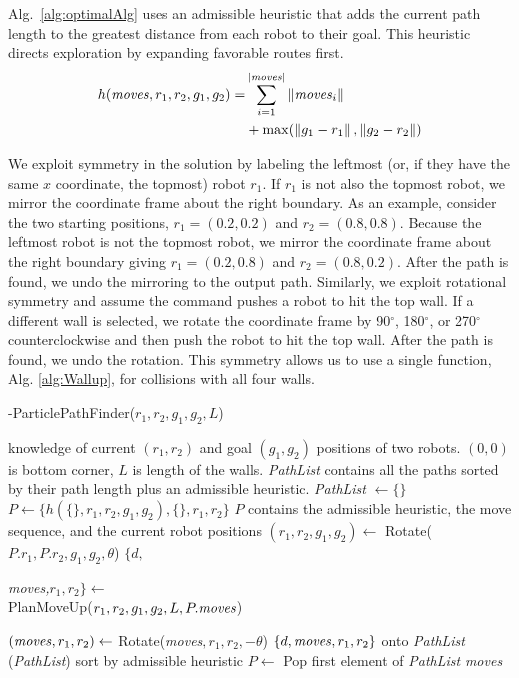 Alg.~\ref{alg:optimalAlg} uses an admissible heuristic that adds the current path length to the greatest distance from each robot to their goal. This heuristic directs exploration by expanding favorable routes first.
\begin{align}\label{eq:admissibleHeuristic}
h(\text{\emph{moves}}, r_1,r_2,g_1,g_2) =& \sum_{i=1}^{|\text{\emph{moves}}|} \left\lVert\text{\emph{moves}}_i\right\rVert  \\
&+  \max( \left\lVert g_1-r_1\right\rVert, \left\lVert g_2-r_2\right\rVert ) \nonumber
\end{align}


We  exploit symmetry in the solution by labeling the leftmost (or, if they have the same $x$ coordinate, the topmost) robot $r_1$. 
 If $r_1$ is not also the topmost robot, we mirror the coordinate frame about the right boundary. 
 As an example, consider the two starting positions, $r_1 =  (0.2, 0.2) $ and $r_2 = (0.8, 0.8)$. 
  Because the leftmost robot is not the topmost robot, we mirror the coordinate frame about the right boundary giving $r_1 = (0.2, 0.8)$ and $r_2 = (0.8,0.2)$. 
 After the path is found, we undo the mirroring to the output path. 
  Similarly, we exploit rotational symmetry and assume the command pushes a robot to hit the top wall.
   If a different wall is selected, we rotate the coordinate frame by 90$^{\circ}$, 180$^{\circ}$, or 270$^{\circ}$ counterclockwise and then push the robot to hit the top wall.  After the path is found, we undo the rotation. 
   This symmetry allows us to use a single function, Alg. \ref{alg:Wallup},  for collisions with all four walls. 

\begin{algorithm}[htb]
\caption{ { -ParticlePathFinder}($r_1,r_2,g_1,g_2,L$)}\label{alg:optimalAlg}
\begin{algorithmic}[1]
\Require knowledge of current $(r_1,r_2)$ and goal $(g_1,g_2)$ positions of  two robots. 
$(0,0)$ is bottom corner,
 $L$ is length of the walls. 
 \emph{PathList} contains all the paths sorted by their path length plus an admissible heuristic. 
 \State  \emph{PathList} $\gets \{\}$
 \State $P \gets   \{ h(\{\},r_1,r_2,g_1,g_2  ) ,\{\},r_1,r_2\} $ \Comment $P$ contains the admissible heuristic, the move sequence, and the current robot positions
\State $(r_1,r_2,g_1,g_2) \gets$ {\sc Rotate}($P.r_1,P.r_2,g_1,g_2,\theta$)
\State $\{d, $ \parbox[t]{.3\linewidth}{%
 \emph{moves,}$ r_1,r_2\} \gets$\\
 {\sc  PlanMoveUp}($r_1,r_2,g_1,g_2,L, P.\text{\emph{moves}}$)}
\State $(\text{\emph{moves}}, r_1,r_2) \gets$ {\sc Rotate}(\emph{moves}$, r_1,r_2,-\theta$)
 $\{d, \text{\emph{moves}}, r_1,r_2\} $ onto \emph{PathList}
\EndFor
{}(\emph{PathList}) \Comment sort by admissible heuristic
\State $P \gets $ {\sc Pop} first element of \emph{PathList}
\EndWhile
\State \Return \emph{moves}
\end{algorithmic}
\end{algorithm}


